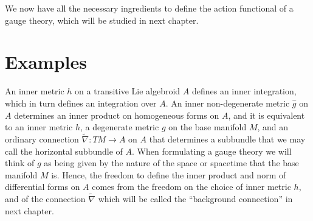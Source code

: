 We now have all the necessary ingredients to define the action functional of a gauge theory, which will be studied in next chapter.

\section{Examples}
\label{chIntegrationSectionExamples}

An inner metric $h$ on a transitive Lie algebroid $A$ defines an inner integration, which in turn defines an integration over $A$. An inner non-degenerate metric $\hat g$ on $A$ determines an inner product on homogeneous forms on $A$, and it is equivalent to an inner metric $h$, a degenerate metric $g$ on the base manifold $M$, and an ordinary connection $\tilde \nabla: TM \to A$ on $A$ that determines a subbundle that we may call the horizontal subbundle of $A$. When formulating a gauge theory we will think of $g$ as being given by the nature of the space or spacetime that the base manifold $M$ is. Hence, the freedom to define the inner product and norm of differential forms on $A$ comes from the freedom on the choice of inner metric $h$, and of the connection $\tilde \nabla$ which will be called the ``background connection'' in next chapter.

